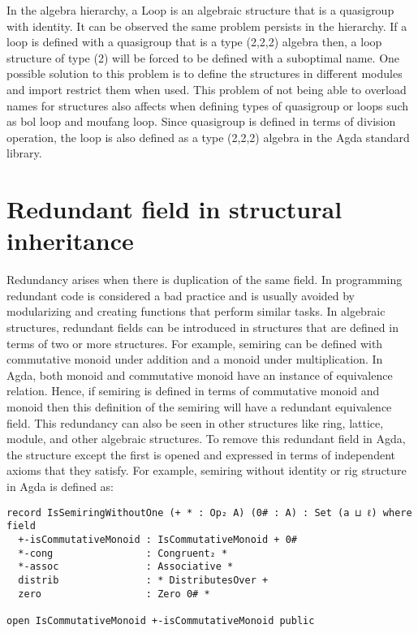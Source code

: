 In the algebra hierarchy, a Loop is an algebraic structure that is a quasigroup
with identity. It can be observed the same problem persists in the hierarchy. If
a loop is defined with a quasigroup that is a type (2,2,2) algebra then, a loop
structure of type (2) will be forced to be defined with a suboptimal name. One
possible solution to this problem is to define the structures in different
modules and import restrict them when used. This problem of not being able to
overload names for structures also affects when defining types of quasigroup or
loops such as bol loop and moufang loop. Since quasigroup is defined in terms of
division operation, the loop is also defined as a type (2,2,2) algebra in the Agda
standard library.

\section{Redundant field in structural inheritance}
Redundancy arises when there is duplication of the same field. In programming
redundant code is considered a bad practice and is usually avoided by
modularizing and creating functions that perform similar tasks. In algebraic
structures, redundant fields can be introduced in structures that are defined in
terms of two or more structures. For example, semiring can be defined with
commutative monoid under addition and a monoid under multiplication. In Agda,
both monoid and commutative monoid have an instance of equivalence relation.
Hence, if semiring is defined in terms of commutative monoid and monoid then
this definition of the semiring will have a redundant equivalence field. This
redundancy can also be seen in other structures like ring, lattice, module, and
other algebraic structures. To remove this redundant field in Agda, the
structure except the first is opened and expressed in terms of independent
axioms that they satisfy. For example, semiring without identity or rig
structure in Agda is defined as:

\begin{verbatim}
record IsSemiringWithoutOne (+ * : Op₂ A) (0# : A) : Set (a ⊔ ℓ) where
field
  +-isCommutativeMonoid : IsCommutativeMonoid + 0#
  *-cong                : Congruent₂ *
  *-assoc               : Associative *
  distrib               : * DistributesOver +
  zero                  : Zero 0# *

open IsCommutativeMonoid +-isCommutativeMonoid public
\end{verbatim}

